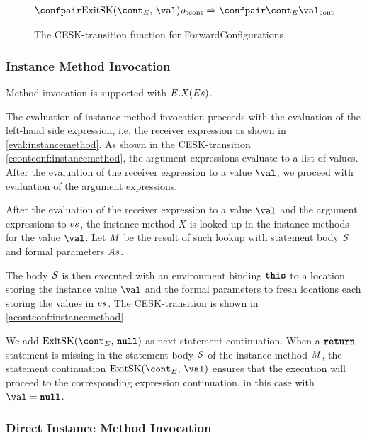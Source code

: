 \documentclass[a4paper,oneside,fleqn]{article}
\newcommand{\synt}[1]{\ensuremath{\text{\textbf{\texttt{#1}}}}}
\DeclareMathOperator{\nnull}{\synt{null}}
\DeclareMathOperator{\return}{\synt{return}}
\newcommand{\this}{\synt{this}}
\newcommand{\idmeta}{\ensuremath{\mathit{X}}}
\newcommand{\cesktrans}[2]{\ensuremath{{#1} \Rightarrow {#2}}}
\begin{document}
\begin{figure}[Htp]
    \begin{eqfigure}
    \begin{align}
    \cesktrans%
        {\scontconf{\ExitSK{\val}}{\env}}%
        {\contconf{\econt}{\val}}
    \end{align}
    \caption{The CESK-transition function for ForwardConfigurations}
    \label{figure:instance-method-evalconfigs}
    \end{eqfigure}
\end{figure}


\subsubsection{Instance Method Invocation}
\label{subsubsec:instance-method-invoc}

Method invocation is supported with $\InstanceMethodInvocation{\expressionmeta}{\idmeta}{\expressionsmeta}$.

The evaluation of instance method invocation proceeds with the evaluation of the left-hand side expression, i.e. the receiver expression as shown in \eqref{eval:instancemethod}.
As shown in the CESK-transition \eqref{econtconf:instancemethod}, the argument expressions evaluate to a list of values.
After the evaluation of the receiver expression to a value $\val$, we proceed with evaluation of the argument expressions.

After the evaluation of the receiver expression to a value $\val$ and the argument expressions to $vs$, the instance method $\idmeta$ is looked up in the instance methods for the value $\val$.
Let $\mathit{M}$ be the result of such lookup with statement body $\mathit{S}$ and formal parameters $As$.

The body $\mathit{S}$ is then executed with an environment binding $\this$ to a location storing the instance value $\val$ and the formal parameters to fresh locations each storing the values in $vs$.
The CESK-transition is shown in \eqref{acontconf:instancemethod}.

We add $\ExitSK{\nnull}$ as next statement continuation.
When a $\return$ statement is missing in the statement body $\mathit{S}$ of the instance method $\mathit{M}$, the statement continuation $\ExitSK{\val}$ ensures that the execution will proceed to the corresponding expression continuation, in this case with $\val = \nnull$.


\subsubsection{Direct Instance Method Invocation}
\label{subsubsec:direct-instance-method-invoc}
\end{document}
